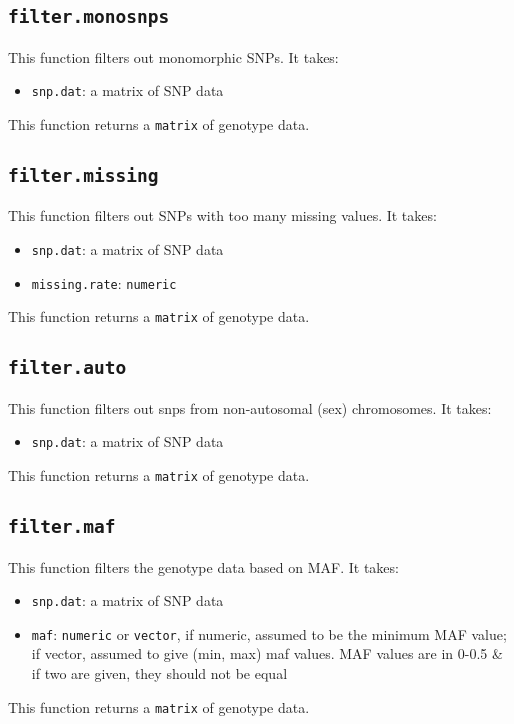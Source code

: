 \documentclass[11pt]{article}
\begin{document}
\subsection{\texttt{filter.monosnps}}
This function filters out monomorphic SNPs. It takes:
\begin{itemize}
	\item \texttt{snp.dat}: a matrix of SNP data
\end{itemize}
This function returns a \texttt{matrix} of genotype data.

\subsection{\texttt{filter.missing}}
This function filters out SNPs with too many missing values. It takes:
\begin{itemize}
	\item \texttt{snp.dat}: a matrix of SNP data
	\item \texttt{missing.rate}: \texttt{numeric}
\end{itemize}
This function returns a \texttt{matrix} of genotype data.

\subsection{\texttt{filter.auto}}
This function filters out snps from non-autosomal (sex) chromosomes. It takes:
\begin{itemize}
	\item \texttt{snp.dat}: a matrix of SNP data
\end{itemize}
This function returns a \texttt{matrix} of genotype data.

\subsection{\texttt{filter.maf}}
This function filters the genotype data based on MAF. It takes:
\begin{itemize}
	\item \texttt{snp.dat}: a matrix of SNP data
	\item \texttt{maf}: \texttt{numeric} or \texttt{vector}, if numeric, assumed to be the minimum MAF value; if vector, assumed to give (min, max) maf values. MAF values are in 0-0.5 \& if two are given, they should not be equal
\end{itemize}
This function returns a \texttt{matrix} of genotype data.
\end{document}

